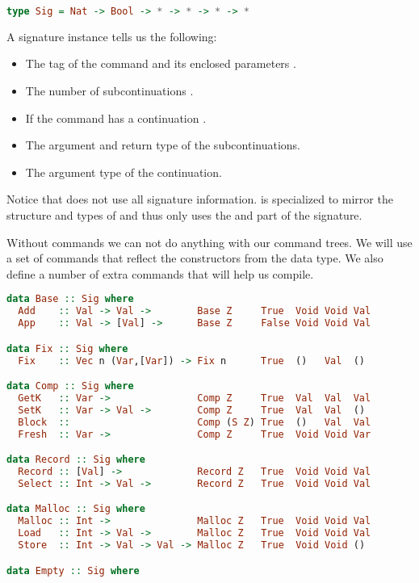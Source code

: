 \begin{lstlisting}[language=Haskell]
type Sig = Nat -> Bool -> * -> * -> * -> *
\end{lstlisting}

A signature instance  tells us the following:

\begin{itemize}
\item The tag of the command and its enclosed parameters .
\item The number of subcontinuations .
\item If the command has a continuation .
\item The argument  and return type  of the subcontinuations.
\item The argument type  of the continuation.
\end{itemize}

Notice that  does not use all signature information.  is specialized to mirror the structure and types of  and thus only uses the  and  part of the signature.

Without commands we can not do anything with our command trees. We will use a set of commands that reflect the constructors from the  data type. We also define a number of extra commands that will help us compile.

\begin{lstlisting}[language=Haskell]
data Base :: Sig where
  Add    :: Val -> Val ->        Base Z     True  Void Void Val
  App    :: Val -> [Val] ->      Base Z     False Void Void Val

data Fix :: Sig where
  Fix    :: Vec n (Var,[Var]) -> Fix n      True  ()   Val  ()

data Comp :: Sig where
  GetK   :: Var ->               Comp Z     True  Val  Val  Val
  SetK   :: Var -> Val ->        Comp Z     True  Val  Val  ()
  Block  ::                      Comp (S Z) True  ()   Val  Val
  Fresh  :: Var ->               Comp Z     True  Void Void Var

data Record :: Sig where
  Record :: [Val] ->             Record Z   True  Void Void Val
  Select :: Int -> Val ->        Record Z   True  Void Void Val

data Malloc :: Sig where
  Malloc :: Int ->               Malloc Z   True  Void Void Val
  Load   :: Int -> Val ->        Malloc Z   True  Void Void Val
  Store  :: Int -> Val -> Val -> Malloc Z   True  Void Void ()

data Empty :: Sig where
\end{lstlisting}

